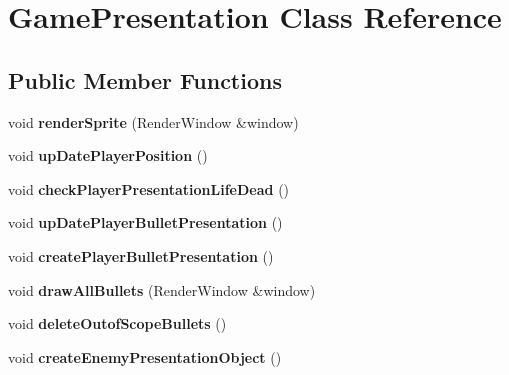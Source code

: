 \hypertarget{class_game_presentation}{}\section{Game\+Presentation Class Reference}
\label{class_game_presentation}
\subsection*{Public Member Functions}
\begin{DoxyCompactItemize}
\item 
\mbox{\label{class_game_presentation_ae2a317ddda3f666fdb1ca4f4c68f6b49}} 
void {\bfseries render\+Sprite} (Render\+Window \&window)
\item 
\mbox{\label{class_game_presentation_a08abc97c6f65eda4ac7c54d55a9054b4}} 
void {\bfseries up\+Date\+Player\+Position} ()
\item 
\mbox{\label{class_game_presentation_a027b38ee9bf11018b4db7494d2e145a0}} 
void {\bfseries check\+Player\+Presentation\+Life\+Dead} ()
\item 
\mbox{\label{class_game_presentation_af0a19d50c4099e7a19426cdffa5ebb82}} 
void {\bfseries up\+Date\+Player\+Bullet\+Presentation} ()
\item 
\mbox{\label{class_game_presentation_ac87927887e1afc5583036efb01ab35ca}} 
void {\bfseries create\+Player\+Bullet\+Presentation} ()
\item 
\mbox{\label{class_game_presentation_a874688a19d648902d43751a198e2d9ab}} 
void {\bfseries draw\+All\+Bullets} (Render\+Window \&window)
\item 
\mbox{\label{class_game_presentation_a313bd414a0cc712fccd919df4b794b8a}} 
void {\bfseries delete\+Outof\+Scope\+Bullets} ()
\item 
\mbox{\label{class_game_presentation_a59645176840f6ddec2673b9d447334d5}} 
void {\bfseries create\+Enemy\+Presentation\+Object} ()
\item 

\end{DoxyCompactItemize}
